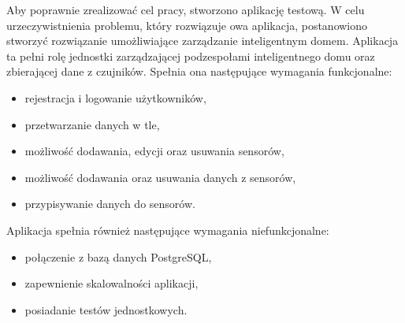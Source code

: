 Aby poprawnie zrealizować cel pracy, stworzono aplikację testową. W celu urzeczywistnienia problemu, który rozwiązuje owa aplikacja, postanowiono stworzyć rozwiązanie umożliwiające zarządzanie inteligentnym domem. Aplikacja ta pełni rolę jednostki zarządzającej podzespołami inteligentnego domu oraz zbierającej dane z czujników. Spełnia ona następujące wymagania funkcjonalne:
\begin{itemize}
  \item rejestracja i logowanie użytkowników,
  \item przetwarzanie danych w tle,
  \item możliwość dodawania, edycji oraz usuwania sensorów,
  \item możliwość dodawania oraz usuwania danych z sensorów,
  \item przypisywanie danych do sensorów.
\end{itemize}

Aplikacja spełnia również następujące wymagania niefunkcjonalne:
\begin{itemize}
  \item połączenie z bazą danych PostgreSQL,
  \item zapewnienie skalowalności aplikacji,
  \item posiadanie testów jednostkowych.
\end{itemize}
